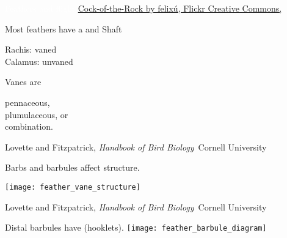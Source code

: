 \documentclass[t]{beamer}
\begin{document}

{
\begin{frame}[b,plain]{\textcolor{white}{Feathers and flight}}
	\tiny \hspace{4em}\textcolor{cotr}{\href{https://www.flickr.com/photos/24201429@N04/13995876801}{Cock-of-the-Rock by felixú, Flickr Creative Commons, }}
\end{frame}
}


{

\begin{frame}[t,plain]{Most feathers have a  and }
	\hangpara Shaft
	
	\quad Rachis: vaned \\
	\quad Calamus: unvaned
	
	\hangpara Vanes are
	
	\quad pennaceous,\\
	\quad plumulaceous, or\\
	\quad combination.
	
	\vfilll
	
	\tiny Lovette and Fitzpatrick, \textit{Handbook of Bird Biology} \textcopyright\,Cornell University
\end{frame}
}

{
\begin{frame}[t,plain]{Barbs and barbules affect structure.}

	\vspace{-\baselineskip}
	
	\centering
	
	\texttt{[image: feather\_vane\_structure]}
	
	\tiny \hfill Lovette and Fitzpatrick, \textit{Handbook of Bird Biology} \textcopyright\,Cornell University
\end{frame}
}
%

\begin{frame}[t,plain]{Distal barbules have  (hooklets).}
\centering
\texttt{[image: feather\_barbule\_diagram]}
\end{frame}
%
\end{document}
